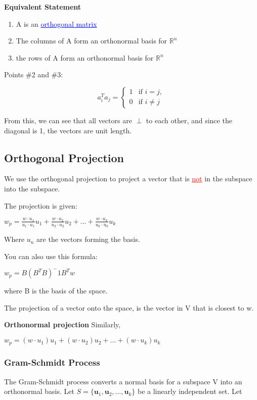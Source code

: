 \documentclass{article}
\newcommand{\bul}[1]{\textcolor{blue}{\underline{#1}}}
\newcommand{\rul}[1]{\textcolor{red}{\underline{#1}}}
\newcommand{\sub}[1]{\vspace{10pt}\textbf{#1}}
\begin{document}
\sub{Equivalent Statement}
\begin{enumerate}
    \item A is an \bul{orthogonal matrix}
    \item The columns of A form an orthonormal basis for $\mathbb{R}^n$
    \item the rows of A form an orthonormal basis for $\mathbb{R}^n$
\end{enumerate}
Points \#2 and \#3: 

\[
a_i^T a_j = \begin{cases} 
      1 & \text{if } i = j, \\
      0 & \text{if } i \neq j 
   \end{cases}
\]

From this, we can see that all vectors are $\perp$ to each other, and since the diagonal is 1, the vectors are unit length.

\subsection{Orthogonal Projection}
We use the orthogonal projection to project a vector that is \rul{not} in the subspace into the subspace.

The projection is given:
\begin{center}
    $w_p = \frac{w\cdot u_1}{u_1\cdot u_1}u_1 + \frac{w\cdot u_2}{u_2\cdot u_2}u_2 + ... + \frac{w\cdot u_k}{u_k\cdot u_k}u_k$
\end{center}
Where $u_n$ are the vectors forming the basis.

You can also use this formula:
\begin{center}
    $w_p = B(B^TB)^-1B^Tw$
\end{center}
where B is the basis of the space.

The projection of a vector onto the space, is the vector in V that is closest to w.

\sub{Orthonormal projection}
Similarly,

\begin{center}
    $w_p = (w\cdot u_1)u_1 + (w\cdot u_2)u_2 + ... + (w\cdot u_k)u_k$
\end{center}


\subsubsection{Gram-Schmidt Process}
\label{sec:gsp}
The Gram-Schmidt process converts a normal basis for a subspace V into an orthonormal basis.
Let $S = \{ \mathbf{u}_1, \mathbf{u}_2, \dots, \mathbf{u}_k \}$ be a linearly independent set. Let
\end{document}
